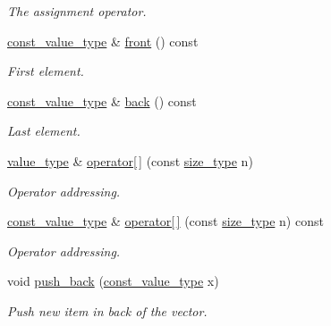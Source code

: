 \begin{DoxyCompactItemize}
\begin{DoxyCompactList}\small\item\em The assignment operator. \end{DoxyCompactList}\item 
\hyperlink{classatom_1_1vector__t_a14fe7ee127e522f41f345462311c924e}{const\+\_\+value\+\_\+type} \& \hyperlink{classatom_1_1vector__t_a1c0df3e4399ea92d4213986c2e5359bf}{front} () const
\begin{DoxyCompactList}\small\item\em First element. \end{DoxyCompactList}\item 
\hyperlink{classatom_1_1vector__t_a14fe7ee127e522f41f345462311c924e}{const\+\_\+value\+\_\+type} \& \hyperlink{classatom_1_1vector__t_a081ce30b6b112520ce41879cf383a409}{back} () const
\begin{DoxyCompactList}\small\item\em Last element. \end{DoxyCompactList}\item 
\hyperlink{classatom_1_1vector__t_a558283a4fed53856d445ceb61ac96d94}{value\+\_\+type} \& \hyperlink{classatom_1_1vector__t_aa8d100ece074c429aafe4cd110165643}{operator\mbox{[}$\,$\mbox{]}} (const \hyperlink{classatom_1_1vector__t_a1790d79321f4fa8d2580474dd0f56033}{size\+\_\+type} n)
\begin{DoxyCompactList}\small\item\em Operator addressing. \end{DoxyCompactList}\item 
\hyperlink{classatom_1_1vector__t_a14fe7ee127e522f41f345462311c924e}{const\+\_\+value\+\_\+type} \& \hyperlink{classatom_1_1vector__t_ab3cbcfdd1fdadcd927eb1ef629d2f814}{operator\mbox{[}$\,$\mbox{]}} (const \hyperlink{classatom_1_1vector__t_a1790d79321f4fa8d2580474dd0f56033}{size\+\_\+type} n) const
\begin{DoxyCompactList}\small\item\em Operator addressing. \end{DoxyCompactList}\item 
void \hyperlink{classatom_1_1vector__t_a92c657f98ab473119a6b04dad7cd2091}{push\+\_\+back} (\hyperlink{classatom_1_1vector__t_a14fe7ee127e522f41f345462311c924e}{const\+\_\+value\+\_\+type} x)
\begin{DoxyCompactList}\small\item\em Push new item in back of the vector. \end{DoxyCompactList}\item 

\end{DoxyCompactItemize}
